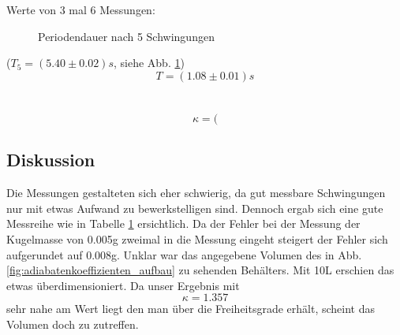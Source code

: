\documentclass[12pt,a4paper]{article}
\begin{document}
\begin{multicols}{2}
Werte von 3 mal 6 Messungen:
\begin{figure}[H]
	\centering
	\caption{Periodendauer nach 5 Schwingungen}
	\label{fig:adiabaten_periode_messung}
\end{figure}
\noindent
($T_5 = (5.40 \pm 0.02)s$, siehe Abb. \ref{fig:adiabaten_periode_messung})
$$T=(1.08 \pm 0.01)s$$\\
\\
$$\kappa = ($$

\subsection{Diskussion}
Die Messungen gestalteten sich eher schwierig, da gut messbare Schwingungen nur mit etwas Aufwand zu bewerkstelligen sind. Dennoch ergab sich eine gute Messreihe wie in Tabelle \ref{fig:adiabaten_periode_messung} ersichtlich.
Da der Fehler bei der Messung der Kugelmasse von 0.005g zweimal in die Messung eingeht steigert der Fehler sich aufgerundet auf 0.008g. Unklar war das angegebene Volumen des in Abb. \ref{fig:adiabatenkoeffizienten_aufbau} zu sehenden Behälters. Mit 10L erschien das etwas überdimensioniert. Da unser Ergebnis mit $$\kappa = 1.357$$ sehr nahe am Wert liegt den man über die Freiheitsgrade erhält, scheint das Volumen doch zu zutreffen.



\end{multicols}
\end{document}
